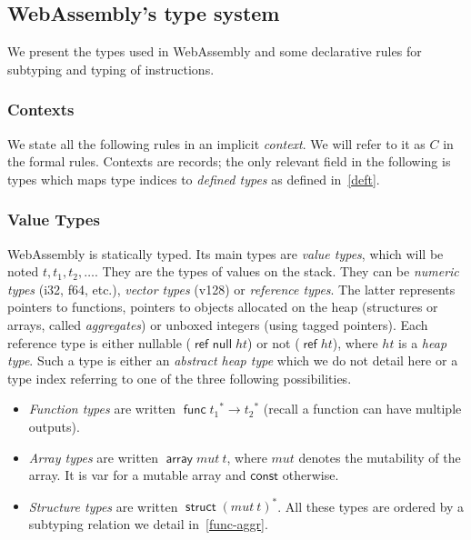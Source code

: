 \documentclass[a4paper,11pt]{article}
\DeclareMathOperator{\reft}{\textsf{ref}}
\DeclareMathOperator{\strt}{\textsf{struct}}
\DeclareMathOperator{\arrt}{\textsf{array}}
\DeclareMathOperator{\funt}{\textsf{func}}
\DeclareMathOperator{\refnullt}{\textsf{ref null}}
\begin{document}
\subsection{WebAssembly's type system}
We present the types used in WebAssembly and some declarative rules for
subtyping and typing of instructions.
\subsubsection{Contexts}
We state all the following rules in an implicit \emph{context}. We will refer to
it as $C$ in the formal rules. Contexts are records; the only relevant field in
the following is \textsf{types} which maps type indices to \emph{defined types}
as defined in~\ref{deft}.

\subsubsection{Value Types}
WebAssembly is statically typed. Its main types are \emph{value types}, which
will be noted $t, t_1, t_2, \ldots$. They are the types of values on the stack.
They can be \emph{numeric types} (\textsf{i32}, \textsf{f64}, etc.),
\emph{vector types} (\textsf{v128}) or \emph{reference types}. The latter
represents pointers to functions, pointers to objects allocated on the heap
(structures or arrays, called \emph{aggregates}) or unboxed integers (using
tagged pointers). Each reference type is either nullable ($\refnullt ht$) or not
($\reft ht$), where $ht$ is a \emph{heap type}. Such a type is either an
\emph{abstract heap type} which we do not detail here or a type index referring
to one of the three following possibilities.
\begin{itemize}
  \item \emph{Function types} are written
$\funt{t_1}^*\to{t_2}^*$ (recall a function can have multiple outputs).
  \item \emph{Array types} are written $\arrt mut\ t$, where $mut$ denotes the
mutability of the array. It is \textsf{var} for a mutable array and
$\textsf{const}$ otherwise.
\item \emph{Structure types} are written $\strt
  {(mut\ t)}^*$. All these types are ordered by a subtyping relation we detail
in~\ref{func-aggr}.
\end{itemize}
\end{document}

